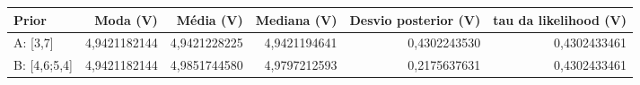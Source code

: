 \begin{tabular}{lrrrrr}
\toprule
Prior & Moda (V) & Média (V) & Mediana (V) & Desvio posterior (V) & tau da likelihood (V) \\
\midrule
A: [3,7] & 4,9421182144 & 4,9421228225 & 4,9421194641 & 0,4302243530 & 0,4302433461 \\
B: [4,6;5,4] & 4,9421182144 & 4,9851744580 & 4,9797212593 & 0,2175637631 & 0,4302433461 \\
\bottomrule
\end{tabular}
